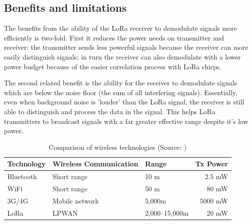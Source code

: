\subsection{Benefits and limitations}\label{sec:lora-benefits}

The benefits from the ability of the LoRa receiver to demodulate signals more
efficiently is two-fold. First it reduces the power needs on transmitter and
receiver: the transmitter sends less powerful signals because the receiver can
more easily distinguish signals; in turn the receiver can also demodulate with a
lower power budget because of the easier correlation process with LoRa chirps.

The second related benefit is the ability for the receiver to demodulate signals
which are below the noise floor (the sum of all interfering signals).
Essentially, even when background noise is 'louder' than the LoRa signal, the
receiver is still able to distinguish and process the data in the signal. This
helps LoRa transmitters to broadcast signals with a far greater effective range
despite it's low power. 

\begin{table}[ht]
  \centering
  \begin{tabular}{|l|l|p{4.5cm}|r|}
    \hline
\textbf{Technology} & \textbf{Wireless Communication} & \textbf{Range} &
\textbf{Tx Power} \\
    \hline
    Bluetooth & Short range & 10 m & 2.5 mW \\
    \hline
    WiFi & Short range & 50 m & 80 mW \\
    \hline
    3G/4G & Mobile network & 5,000m & 5000 mW \\
    \hline
    LoRa & LPWAN & \parbox[t]{4.5cm}{2,000--15,000m} & 20 mW \\
    \hline
  \end{tabular}
    \caption{Comparison of wireless technologies (Source:
  \cite{lie_lora_readthedocs})}
\end{table}
